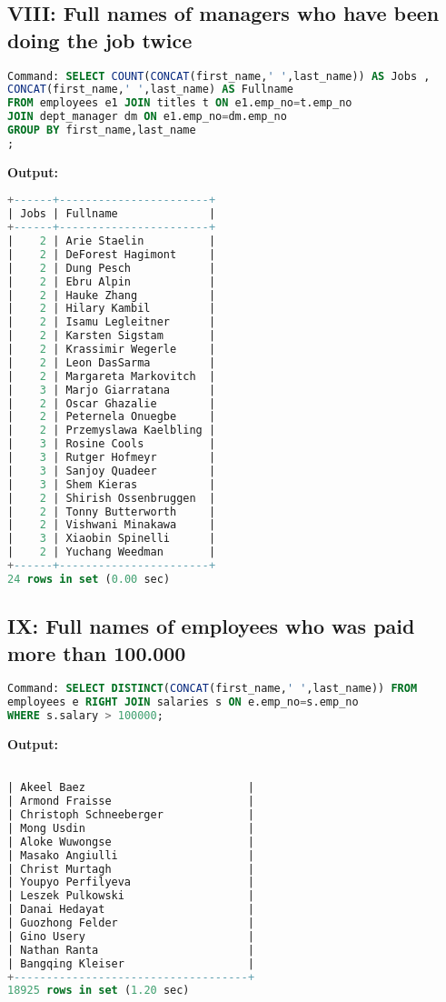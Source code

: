 \documentclass[12pt]{report}
\begin{document}
\subsection*{VIII: Full names of managers who have been doing the job twice}

\begin{lstlisting}[language=sql]
Command: SELECT COUNT(CONCAT(first_name,' ',last_name)) AS Jobs ,
CONCAT(first_name,' ',last_name) AS Fullname 
FROM employees e1 JOIN titles t ON e1.emp_no=t.emp_no 
JOIN dept_manager dm ON e1.emp_no=dm.emp_no 
GROUP BY first_name,last_name
;

\end{lstlisting}
\textbf{Output:}
\begin{lstlisting}[language=sql]
+------+-----------------------+
| Jobs | Fullname              |
+------+-----------------------+
|    2 | Arie Staelin          |
|    2 | DeForest Hagimont     |
|    2 | Dung Pesch            |
|    2 | Ebru Alpin            |
|    2 | Hauke Zhang           |
|    2 | Hilary Kambil         |
|    2 | Isamu Legleitner      |
|    2 | Karsten Sigstam       |
|    2 | Krassimir Wegerle     |
|    2 | Leon DasSarma         |
|    2 | Margareta Markovitch  |
|    3 | Marjo Giarratana      |
|    2 | Oscar Ghazalie        |
|    2 | Peternela Onuegbe     |
|    2 | Przemyslawa Kaelbling |
|    3 | Rosine Cools          |
|    3 | Rutger Hofmeyr        |
|    3 | Sanjoy Quadeer        |
|    3 | Shem Kieras           |
|    2 | Shirish Ossenbruggen  |
|    2 | Tonny Butterworth     |
|    2 | Vishwani Minakawa     |
|    3 | Xiaobin Spinelli      |
|    2 | Yuchang Weedman       |
+------+-----------------------+
24 rows in set (0.00 sec)

\end{lstlisting}


\subsection*{IX: Full names of employees who was paid more than 100.000}

\begin{lstlisting}[language=sql]
Command: SELECT DISTINCT(CONCAT(first_name,' ',last_name)) FROM 
employees e RIGHT JOIN salaries s ON e.emp_no=s.emp_no 
WHERE s.salary > 100000;
\end{lstlisting}
\textbf{Output:}
\begin{lstlisting}[language=sql]

| Akeel Baez                         |
| Armond Fraisse                     |
| Christoph Schneeberger             |
| Mong Usdin                         |
| Aloke Wuwongse                     |
| Masako Angiulli                    |
| Christ Murtagh                     |
| Youpyo Perfilyeva                  |
| Leszek Pulkowski                   |
| Danai Hedayat                      |
| Guozhong Felder                    |
| Gino Usery                         |
| Nathan Ranta                       |
| Bangqing Kleiser                   |
+------------------------------------+
18925 rows in set (1.20 sec)

\end{lstlisting}
\end{document}
